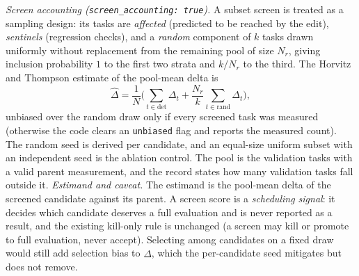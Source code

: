 \emph{Screen accounting (\texttt{screen\_\allowbreak accounting: true}).}
A subset screen is treated as a sampling design: its tasks are \emph{affected} (predicted to be reached by the edit),
\emph{sentinels} (regression checks), and a \emph{random} component of $k$ tasks drawn uniformly without replacement
from the remaining pool of size $N_r$, giving inclusion probability $1$ to the first two strata and $k/N_r$ to the third.
The Horvitz and Thompson estimate of the pool-mean delta is
\begin{equation}
  \hat\Delta=\frac1N\Big(\sum_{t\in\text{det}}\Delta_t+\frac{N_r}{k}\sum_{t\in\text{rand}}\Delta_t\Big),
\end{equation}
unbiased over the random draw only if every screened task was measured (otherwise the code clears an \texttt{unbiased}
flag and reports the measured count). The random seed is derived per candidate, and an equal-size uniform subset with an
independent seed is the ablation control. The pool is the validation tasks with a valid parent measurement, and the
record states how many validation tasks fall outside it.
\emph{Estimand and caveat.} The estimand is the pool-mean delta of the screened candidate against its parent. A screen
score is a \emph{scheduling signal}: it decides which candidate deserves a full evaluation and is never reported as a
result, and the existing kill-only rule is unchanged (a screen may kill or promote to full evaluation, never accept).
Selecting among candidates on a fixed draw would still add selection bias to $\hat\Delta$, which the per-candidate seed
mitigates but does not remove.

